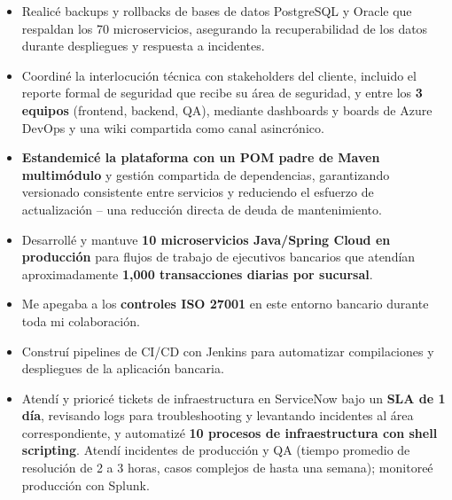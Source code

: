 {\begin{itemize}
    \item Realicé backups y rollbacks de bases de datos PostgreSQL y Oracle que respaldan los 70 microservicios, asegurando la recuperabilidad de los datos durante despliegues y respuesta a incidentes.
    \item Coordiné la interlocución técnica con stakeholders del cliente, incluido el reporte formal de seguridad que recibe su área de seguridad, y entre los \textbf{3 equipos} (frontend, backend, QA), mediante dashboards y boards de Azure DevOps y una wiki compartida como canal asincrónico.
\end{itemize}

\begin{itemize}
    \item \textbf{Estandemicé la plataforma con un POM padre de Maven multimódulo} y gestión compartida de dependencias, garantizando versionado consistente entre servicios y reduciendo el esfuerzo de actualización -- una reducción directa de deuda de mantenimiento.
    \item Desarrollé y mantuve \textbf{10 microservicios Java/Spring Cloud en producción} para flujos de trabajo de ejecutivos bancarios que atendían aproximadamente \textbf{1,000 transacciones diarias por sucursal}.
    \item Me apegaba a los \textbf{controles ISO 27001} en este entorno bancario durante toda mi colaboración.
    \item Construí pipelines de CI/CD con Jenkins para automatizar compilaciones y despliegues de la aplicación bancaria.
    \item Atendí y prioricé tickets de infraestructura en ServiceNow bajo un \textbf{SLA de 1 día}, revisando logs para troubleshooting y levantando incidentes al área correspondiente, y automatizé \textbf{10 procesos de infraestructura con shell scripting}. Atendí incidentes de producción y QA (tiempo promedio de resolución de 2 a 3 horas, casos complejos de hasta una semana); monitoreé producción con Splunk.
\end{itemize}

}
